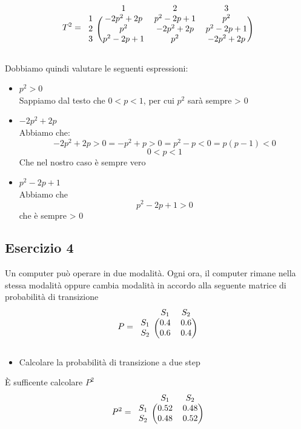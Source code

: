 \documentclass{article}
\begin{document}
\[
T^2 = 
\begin{blockarray}{cccc}
	& 1 & 2 & 3 \\
	\begin{block}{c(ccc)}
		1 &	-2p^2 + 2p    & p^2 -2p + 1   & p^2 \\
		2 &	p^2           & -2p^2 + 2p    & p^2 -2p + 1  \\
		3 &	p^2 -2p + 1   & p^2           & -2p^2 + 2p  \\
	\end{block}
\end{blockarray}
\]

Dobbiamo quindi valutare le seguenti espressioni:
\begin{itemize}
	\item $p^2 > 0$ \\
	Sappiamo dal testo che $0 < p < 1$, per cui $p^2$ sarà sempre > 0
	\item $-2p^2 + 2p$ \\
	Abbiamo che:
	\[
		-2p^2 + 2p > 0 = -p^2 + p > 0 = p^2 -p < 0 = p(p-1) < 0
	\]
	\[
	 0 < p < 1
	\]
	Che nel nostro caso è sempre vero
	\item $p^2 -2p + 1$ \\
	Abbiamo che
	\[
	p^2 -2p + 1 > 0 
	\]
	che è sempre > 0
\end{itemize}

\pagebreak
\subsection{Esercizio 4}

Un computer può operare in due modalità. Ogni ora, il computer rimane nella stessa modalità
oppure cambia modalità in accordo alla seguente matrice di probabilità di transizione
	\[
P = 
\begin{blockarray}{ccc}
	& S_1 & S_2 \\
	\begin{block}{c(cc)}
		S_1  &  0.4   & 0.6 \\
		S_2  &  0.6   & 0.4 \\
	\end{block}
\end{blockarray}
\]

\begin{itemize}
	\item Calcolare la probabilità di transizione a due step
\end{itemize}

È sufficente calcolare $P^2$
	\[
P^2 = 
\begin{blockarray}{ccc}
	& S_1 & S_2 \\
	\begin{block}{c(cc)}
		S_1  &  0.52   & 0.48 \\
		S_2  &  0.48   & 0.52 \\
	\end{block}
\end{blockarray}
\]
\end{document}
